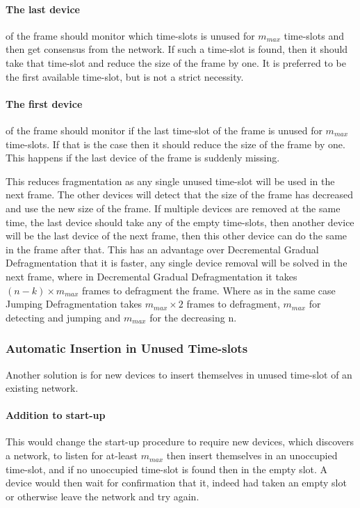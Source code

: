 \paragraph{The last device} of the frame should monitor which time-slots is unused for $m_{max}$ time-slots and then get consensus from the network. 
If such a time-slot is found, then it should take that time-slot and reduce the size of the frame by one. 
It is preferred to be the first available time-slot, but is not a strict necessity.   

\paragraph{The first device} of the frame should monitor if the last time-slot of the frame is unused for $m_{max}$ time-slots.
If that is the case then it should reduce the size of the frame by one.
This happens if the last device of the frame is suddenly missing.


\bigskip

This reduces fragmentation as any single unused time-slot will be used in the next frame.
The other devices will detect that the size of the frame has decreased and use the new size of the frame. 
If multiple devices are removed at the same time, the last device should take any of the empty time-slots, then another device will be the last device of the next frame, then this other device can do the same in the frame after that. 
This has an advantage over Decremental Gradual Defragmentation that it is faster, any single device removal will be solved in the next frame, where in Decremental Gradual Defragmentation it takes $(n - k) \times m_{max}$ frames to defragment the frame. 
Where as in the same case Jumping Defragmentation takes $m_{max} \times 2$ frames to defragment, $m_{max}$ for detecting and jumping and $m_{max}$ for the decreasing n. 

\subsubsection{Automatic Insertion in Unused Time-slots}
Another solution is for new devices to insert themselves in unused time-slot of an existing network.

\paragraph{Addition to start-up}
This would change the start-up procedure to require new devices, which discovers a network, to listen for at-least $m_{max}$ then insert themselves in an unoccupied time-slot, and if no unoccupied time-slot is found then in the empty slot.
A device would then wait for confirmation that it, indeed had taken an empty slot or otherwise leave the network and try again.

